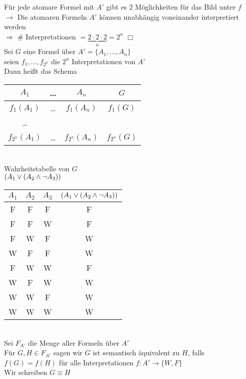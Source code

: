 \beweis{}
Für jede atomare Formel mit $A'$ gibt es $2$ Möglichkeiten für das Bild unter $f$\\
$\rightarrow$ Die atomaren Formeln $A'$ können unabhängig voneinander interpretiert werden\\
$\Rightarrow$ $\#$ Interpretationen $=\underbrace{2 \cdot 2 \cdot 2}_n = 2^n$ \hspace{1cm}\ensuremath{\Box}\\

Sei $G$ eine Formel über $A' = \{A_1, …, A_n \}$\\
seien $f_1, …, f_{2^n}$ die $2^n$ Interpretationen von $A'$\\
Dann heißt das Schema\\
\begin{tabular}{c|c|c|c}
$A_1$ & … & $A_n$ & $G$\\
\hline
$f_1 (A_1)$ & … & $f_1 (A_n)$ & $f_1 (G)$\\
… & & & \\
$f_{2^n} (A_1)$ & … & $f_{2^n} (A_n)$ & $f_{2^n} (G)$
\end{tabular}\\
Wahrheitstabelle von $G$\\

\beispiel{}
$(A_1 \vee (A_2 \wedge \neg A_3))$\\

\begin{tabular}{c|c|c|c}
$A_1$ & $A_2$ & $A_3$ & $(A_1 \vee (A_2 \wedge \neg A_3))$\\
\hline
F & F & F & F\\
F & F & W & F\\
F & W & F & W\\
W & F & F & W\\
F & W & W & F\\
W & F & W & W\\
W & W & F & W\\
W & W & W & W\\
\end{tabular}\\
    
Sei $F_{A'}$ die Menge aller Formeln über $A'$\\
Für $G, H \in F_{A'}$ sagen wir $G$ ist semantisch äquivalent zu $H$, falls $f(G) = f(H)$ für alle Interpretationen $f:A' \rightarrow \{W,F\}$\\
Wir schreiben $G \equiv H$\\